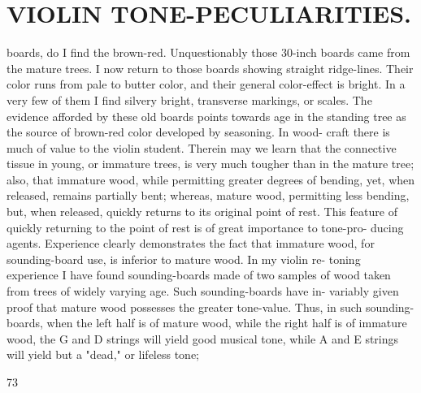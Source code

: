 \documentclass{article}
\begin{document}
\section*{VIOLIN TONE-PECULIARITIES.}
boards, do I find the brown-red. Unquestionably those 30-inch boards came from the mature trees. I now return to those boards showing straight ridge-lines. Their color runs from pale to butter color, and their general color-effect is bright. In a very few of them I find silvery bright, transverse markings, or scales. The evidence afforded by these old boards points towards age in the standing tree as the source of brown-red color developed by seasoning. In wood- craft there is much of value to the violin student. Therein may we learn that the connective tissue in young, or immature trees, is very much tougher than in the mature tree; also, that immature wood, while permitting greater degrees of bending, yet, when released, remains partially bent; whereas, mature wood, permitting less bending, but, when released, quickly returns to its original point of rest. This feature of quickly returning to the point of rest is of great importance to tone-pro- ducing agents. Experience clearly demonstrates the fact that immature wood, for sounding-board use, is inferior to mature wood. In my violin re- toning experience I have found sounding-boards made of two samples of wood taken from trees of widely varying age. Such sounding-boards have in- variably given proof that mature wood possesses the greater tone-value. Thus, in such sounding- boards, when the left half is of mature wood, while the right half is of immature wood, the G and D strings will yield good musical tone, while A and E strings will yield but a "dead," or lifeless tone;

73
\end{document}
